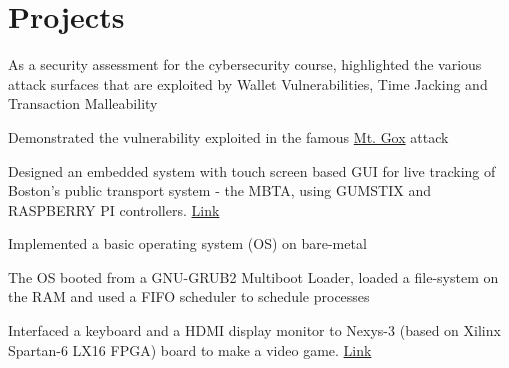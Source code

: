 \documentclass[]{deedy_format_Anmol}
\begin{document}
\begin{minipage}[t]{0.66\textwidth}

\section{Projects}
\vspace{0.5mm} %

\vspace{1mm}
\justify
\begin{tightemize}
\item As a security assessment for the cybersecurity course, highlighted the various attack surfaces that are exploited by Wallet Vulnerabilities, Time Jacking and Transaction Malleability
\item Demonstrated the vulnerability exploited in the famous \href{http://www.darkreading.com/attacks-and-breaches/mt-gox-bitcoin-meltdown-what-went-wrong/d/d-id/1114091}{Mt. Gox} attack 
\end{tightemize}
\vspace{\topsep}
\sectionsep

\vspace{1mm}
\justify
\begin{tightemize}
\item Designed an embedded system with touch screen based GUI for live tracking of Boston’s public transport system - the MBTA, using GUMSTIX and RASPBERRY PI controllers. \href{https://www.youtube.com/watch?v=DtY4qqCeVRI}{Link}
\end{tightemize}
\vspace{\topsep}
\sectionsep

\vspace{1mm}
\justify
\begin{tightemize}
\item Implemented a basic operating system (OS) on bare-metal
\item The OS booted from a GNU-GRUB2 Multiboot Loader, loaded a file-system on the RAM and used a FIFO scheduler to schedule processes
\end{tightemize}
\vspace{\topsep}
\sectionsep

\vspace{1mm}
\justify
\begin{tightemize}
\item Interfaced a keyboard and a HDMI display monitor to Nexys-3 (based on Xilinx Spartan-6 LX16 FPGA) board to make a video game.  \href{https://youtu.be/s36H25OkzVQ}{Link}
\end{tightemize}
\vspace{\topsep}
\sectionsep


\end{minipage}
\end{document}
